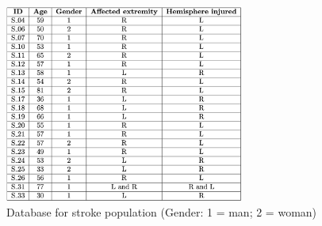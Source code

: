 \begin{figure}[ht]
    \centering
    \includegraphics[width=0.70\textwidth]{appendix/database_stroke.png}
    \caption{Database for stroke population (Gender: 1 = man; 2 = woman) }
    \label{fig: Database stroke}
\end{figure}

\clearpage



\clearpage